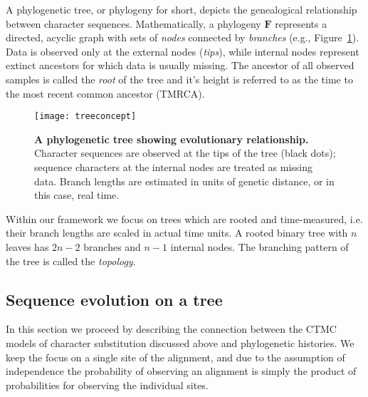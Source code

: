 A phylogenetic tree, or phylogeny for short, depicts the genealogical relationship between character sequences.
Mathematically, a phylogeny $\mathbf{F}$ represents a directed, acyclic graph with sets of \emph{nodes} connected by \emph{branches} (e.g., Figure~\ref{fig:treeconcept}).
Data is observed only at the external nodes (\emph{tips}), while internal nodes represent extinct ancestors for which data is usually missing.
The ancestor of all observed samples is called the \emph{root} of the tree and it's height is referred to as the time to the most recent common ancestor (TMRCA).

\begin{figure}[H]
\centering
\texttt{[image: treeconcept]} 
\caption{
{ \footnotesize 
{\bf A phylogenetic tree showing evolutionary relationship.} Character sequences are observed at the tips of the tree (black dots); sequence characters at the internal nodes are treated as missing data. 
Branch lengths are estimated in units of genetic distance, or in this case, real time.
} %
}
\label{fig:treeconcept}
\end{figure}

Within our framework we focus on trees which are rooted and time-measured, i.e. their branch lengths are scaled in actual time units.
A rooted binary tree with $n$ leaves has $2n-2$ branches and $n-1$ internal nodes.
The branching pattern of the tree is called the \emph{topology}. 

\subsection{Sequence evolution on a tree\label{sub:evolutionOnTree}}

In this section we proceed by describing the connection between the CTMC models of character substitution discussed above and phylogenetic histories.
We keep the focus on a single site of the alignment, and due to the assumption of independence the probability of observing an alignment is simply the product of probabilities for observing the individual sites.

